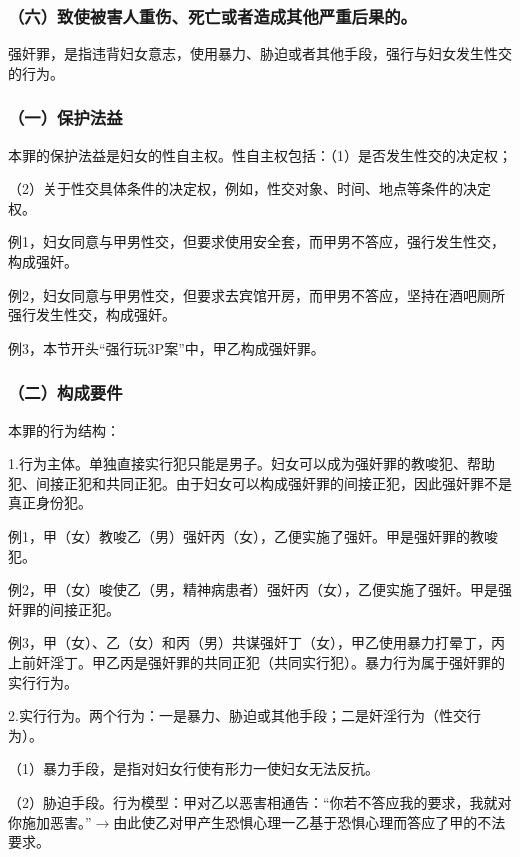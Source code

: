 \subsubsection*{（六）致使被害人重伤、死亡或者造成其他严重后果的。}

强奸罪，是指违背妇女意志，使用暴力、胁迫或者其他手段，强行与妇女发生性交的行为。

\subsubsection*{（一）保护法益}

本罪的保护法益是妇女的性自主权。性自主权包括：（1）是否发生性交的决定权；

（2）关于性交具体条件的决定权，例如，性交对象、时间、地点等条件的决定权。

例1，妇女同意与甲男性交，但要求使用安全套，而甲男不答应，强行发生性交，构成强奸。

例2，妇女同意与甲男性交，但要求去宾馆开房，而甲男不答应，坚持在酒吧厕所强行发生性交，构成强奸。

例3，本节开头“强行玩3P案”中，甲乙构成强奸罪。

\subsubsection*{（二）构成要件}

本罪的行为结构：


1.行为主体。单独直接实行犯只能是男子。妇女可以成为强奸罪的教唆犯、帮助犯、间接正犯和共同正犯。由于妇女可以构成强奸罪的间接正犯，因此强奸罪不是真正身份犯。

例1，甲（女）教唆乙（男）强奸丙（女），乙便实施了强奸。甲是强奸罪的教唆犯。

例2，甲（女）唆使乙（男，精神病患者）强奸丙（女），乙便实施了强奸。甲是强奸罪的间接正犯。

例3，甲（女）、乙（女）和丙（男）共谋强奸丁（女），甲乙使用暴力打晕丁，丙上前奸淫丁。甲乙丙是强奸罪的共同正犯（共同实行犯）。暴力行为属于强奸罪的实行行为。

2.实行行为。两个行为：一是暴力、胁迫或其他手段；二是奸淫行为（性交行为）。

（1）暴力手段，是指对妇女行使有形力一使妇女无法反抗。

（2）胁迫手段。行为模型：甲对乙以恶害相通告：“你若不答应我的要求，我就对你施加恶害。”\ensuremath{\rightarrow}由此使乙对甲产生恐惧心理一乙基于恐惧心理而答应了甲的不法要求。

